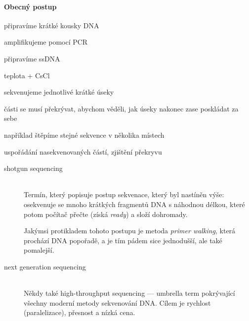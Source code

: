 \documentclass[DIV=8]{scrreprt}
\begin{document}
\paragraph{Obecný postup}
\begin{myEnumerate}[nosep]
    \item připravíme krátké kousky DNA
    \item amplifikujeme pomocí PCR
    \item připravíme ssDNA
\begin{myItemize}[nosep]
    \item teplota + CsCl
\end{myItemize}

    \item sekvenujeme jednotlivé krátké úseky
\begin{myItemize}[nosep]
    \item části se musí překrývat, abychom věděli, jak úseky nakonec zase poskládat za sebe
\begin{myItemize}[nosep]
    \item například štěpíme stejné sekvence v několika místech
\end{myItemize}

\end{myItemize}

    \item uspořádání nasekvenovaných částí, zjištění překryvu
\end{myEnumerate}



\begin{description}
\item[shotgun sequencing]\hfill \\
Termín, který popisuje postup sekvenace, který byl nastíněn výše: osekvenuje se mnoho krátkých fragmentů DNA s náhodnou délkou, které potom počítač přečte (získá \emph{ready}) a složí dohromady.

Jakýmsi protikladem tohoto postupu je metoda \emph{primer walking}, která prochází DNA popořadě, a je tím pádem sice jednodušší, ale také pomalejší.


\item[next generation sequencing]\hfill \\
Někdy také high-throughput sequencing --- umbrella term pokrývající všechny moderní metody sekvenování DNA. Cílem je rychlost (paralelizace), přesnost a nízká cena.

\end{description}
\end{document}
